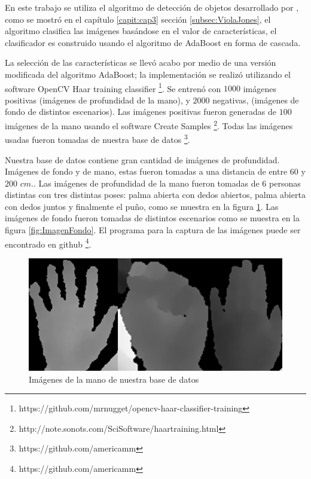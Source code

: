 En este trabajo se utiliza el algoritmo de detección de objetos desarrollado por \citep{Viola2001}, como se mostró en el cap\'itulo \ref{capit:cap3} sección \ref{subsec:ViolaJones}, el algoritmo clasifica las imágenes basándose en el valor de características, el clasificador es construido usando el algoritmo de AdaBoost en forma de cascada. 


La selección de las características se llev\'o acabo por medio de una versión modificada del algoritmo AdaBoost; la implementaci\'on se realiz\'o utilizando el software OpenCV Haar training classifier \footnote{https://github.com/mrnugget/opencv-haar-classifier-training}. Se entren\'o con $1000$ imágenes positivas (imágenes de profundidad de la mano), y $2000$ negativas, (imágenes de fondo de distintos escenarios). Las imágenes positivas fueron generadas de $100$ imágenes de la mano usando el software Create Samples \footnote{http://note.sonots.com/SciSoftware/haartraining.html}. Todas las imágenes usadas fueron tomadas de nuestra base de  datos \footnote{https://github.com/americamm}.

Nuestra base de datos contiene gran cantidad de imágenes de profundidad. Imágenes de fondo y de mano, estas fueron tomadas a una distancia de entre $60$ y $200$ $cm.$. Las imágenes de profundidad de la mano fueron tomadas de $6$ personas distintas con tres distintas poses: palma abierta con dedos abiertos, palma abierta con dedos juntos y finalmente el pu\~no, como se muestra en la figura \ref{fig:ImagenesPoses}. Las imágenes de fondo fueron tomadas de distintos escenarios como se muestra en la figura \ref{fig:ImagenFondo}. El programa para la captura de las imágenes puede ser encontrado en github \footnote{https://github.com/americamm}.  

\begin{figure}[h!]
\begin{center}
\includegraphics[scale=.5]{./Figures/TrainingImages.png}
\end{center}
\caption{Imágenes de la mano de nuestra base de datos}
\label{fig:ImagenesPoses}
\end{figure}  

